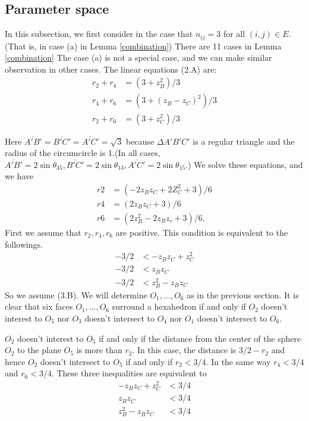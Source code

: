 \documentclass[suppldata, dvipdfmx]{interact}
\theoremstyle{plain}%
\theoremstyle{definition}
\theoremstyle{remark}
\theoremstyle{problemstyle}
\begin{document}
\subsection{Parameter space}\label{paramSpace}
In this subsection, we first consider in the case that $n_{ij} = 3$ for all
$(i, j) \in E$. (That is, in case (a) in Lemma \ref{combination}) There are 11 cases
in Lemma \ref{combination} The case (a) is not a special case, and we can make
similar observation in other cases.
The linear equations (2.A) are:
\begin{align*}
 r_2 + r_4 &= (3 + z_B^2) / 3 \\
 r_4 + r_6 &= (3 + (z_B - z_C)^2 ) / 3 \\
 r_2 + r_6 &= (3 + z_C^2) / 3
\end{align*}

Here $\overline{A'B'} = \overline{B'C'} = \overline{A'C'} = \sqrt{3}$
because $\Delta{A'B'C'}$ is a regular triangle and the radius of the
circumcircle is 1.(In all cases, $\overline{A'B'} = 2\sin\theta_{35},
\overline{B'C'} = 2\sin\theta_{13}, \overline{A'C'} = 2\sin\theta_{15}$.)
We solve these equations, and we have 
\begin{align}
 r2 &= (-2z_Bz_C + 2Z^2_C + 3) / 6 \\
 r4 &= (2z_Bz_C + 3) / 6 \\
 r6 &= (2z^2_B - 2z_Bz_c + 3) / 6.
\end{align}
First we assume that $r_2, r_4, r_6$ are positive. This condition is
equivalent to the followings.
\begin{align}
 -3 / 2 &< -z_Bz_C + z^2_C\\
 -3 / 2 &< z_Bz_C \\
 -3 / 2 &< z^2_B - z_Bz_C
\end{align}
So we assume (3.B). We will determine $O_1, ... , O_6$ as in the
previous section. It is clear that six faces $O_1, ... , O_6$ surround
a hexahedron if and only if $O_2$ doesn't interest to $O_5$ nor $O_3$
doesn't intersect to $O_4$ nor $O_1$ doesn't intersect to $O_6$.

$O_2$ doesn't interest to $O_5$ if and only if the distance from the center
of the sphere $O_2$ to the plane $O_5$ is more than $r_2$. In this case,
the distance is $3 / 2 - r_2$ and hence $O_2$ doesn't intersect to $O_5$
if and only if $r_2 < 3/4$. In the same way $r_4 < 3/4$ and $r_6 <
3/4$. These three inequalities are equivalent to
\begin{align}
 -z_Bz_C + z^2_C &< 3 / 4\\
 z_Bz_C &< 3 / 4 \\
 z^2_B - z_B z_C &< 3/ 4
\end{align}
\end{document}
